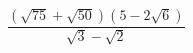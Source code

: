 \begin{ex}[type=expression]
	\begin{condition}
		\( \dfrac{(\sqrt{75}+\sqrt{50})(5-2\sqrt{6})}{\sqrt{3}-\sqrt{2}} \)
	\end{condition}
\end{ex}